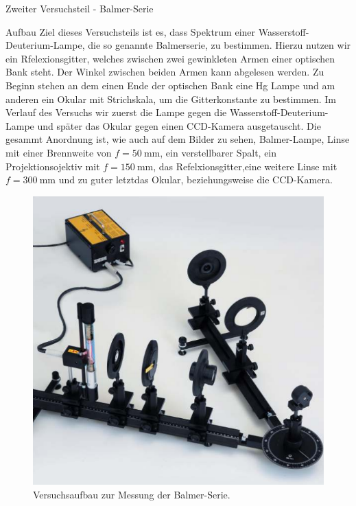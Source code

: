\documentclass[pdftex, a4paper,11pt, twoside, ngerman]{report}
\begin{document}
  \begin{chapter}{Zweiter Versuchsteil - Balmer-Serie}
    \label{chp:Balmer}
 
 
    \begin{section}{Aufbau}
      \label{chp:Balmer:sec:Aufbau}
      Ziel dieses Versuchsteils ist es, dass Spektrum einer
      Wasserstoff-Deuterium-Lampe, die so genannte Balmerserie, zu bestimmen.
      Hierzu nutzen wir ein Rfelexionsgitter, welches zwischen zwei gewinkleten
      Armen einer optischen Bank steht. Der Winkel zwischen beiden Armen kann
      abgelesen werden. Zu Beginn stehen an dem einen Ende der optischen Bank
      eine Hg Lampe und am anderen ein Okular mit Strichskala, um die
      Gitterkonstante zu bestimmen. Im Verlauf des Versuchs wir zuerst die
      Lampe gegen die Wasserstoff-Deuterium-Lampe und später das Okular gegen
      einen CCD-Kamera ausgetauscht. Die gesammt Anordnung ist, wie auch auf
      dem Bilder zu sehen, Balmer-Lampe, Linse mit einer Brennweite von
      $f=\SI{50}{\milli\meter}$, ein verstellbarer Spalt, ein
      Projektionsojektiv mit $f=\SI{150}{\milli\meter}$, das
      Refelxionsgitter,eine weitere Linse mit $f=\SI{300}{\milli\meter}$ und
      zu guter letztdas Okular, beziehungsweise die CCD-Kamera.
      
      \begin{figure}[h]
        \begin{center}
          \includegraphics[width=.7\textwidth]{Figures/Balmeraufbau.png}
          \caption{Versuchsaufbau zur Messung der Balmer-Serie.
              \cite{bib:LDDidactic}}
          \label{fig:BalmerAufbau}
        \end{center}
      \end{figure}
      

\end{section}
\end{chapter}
\end{document}
